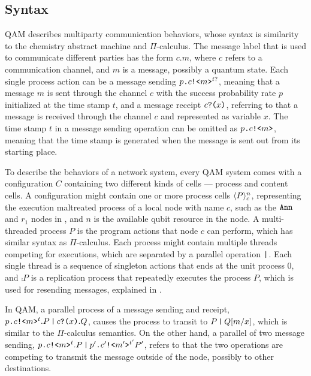 \subsection{Syntax} \label{sec:qamsyntax}

QAM describes multiparty communication behaviors,
whose syntax is similarity to the chemistry abstract machine \cite{BERRY1992217} and $\Pi$-calculus.
The message label that is used to communicate different parties has the form $c.m$, 
where $c$ refers to a communication channel, and $m$ is a message, possibly a quantum state.
Each single process action can be a message sending $p\texttt{.}c\texttt{!<}m\texttt{>}^{t?}$, meaning that a message $m$ is sent through the channel $c$ with the success probability rate $p$ initialized at the time stamp $t$, and a message receipt $c\texttt{?(}x\texttt{)}$, referring to that a message is received through the channel $c$ and represented as variable $x$.
The time stamp $t$ in a message sending operation can be omitted as $p\texttt{.}c\texttt{!<}m\texttt{>}$, meaning that the time stamp is generated when the message is sent out from its starting place.

To describe the behaviors of a network system, every QAM system comes with a configuration $C$
containing two different kinds of cells --- process and content cells.
A configuration might contain one or more process cells $\langle P \rangle^{n}_{c}$, representing the execution maltreated process of a local node with name $c$, such as the $\texttt{Ann}$ and $r_1$ nodes in ,
and $n$ is the available qubit resource in the node.
A multi-threaded process $P$ is the program actions that node $c$ can perform, which has similar syntax as $\Pi$-calculus.
Each process might contain multiple threads competing for executions, which are separated by a parallel operation $\texttt{|}$.
Each single thread is a sequence of singleton actions that ends at the unit process $0$,
and $\comp{P}$ is a replication process that repeatedly executes the process $P$, 
which is used for resending messages, explained in .

In QAM, a parallel process of a message sending and receipt, $p\texttt{.}c\texttt{!<}m\texttt{>}^t.P\,\texttt{|}\,c\texttt{?(}x\texttt{)}.Q$,
causes the process to transit to $P\,\texttt{|}\,Q[m/x]$, which is similar to the $\Pi$-calculus semantics.
On the other hand, a parallel of two message sending, $p\texttt{.}c\texttt{!<}m\texttt{>}^t.P\,\texttt{|}\,p'\texttt{.}c'\texttt{!<}m'\texttt{>}^{t'}{P'}$,
refers to that the two operations are competing to transmit the message outside of the node, possibly to other destinations.

